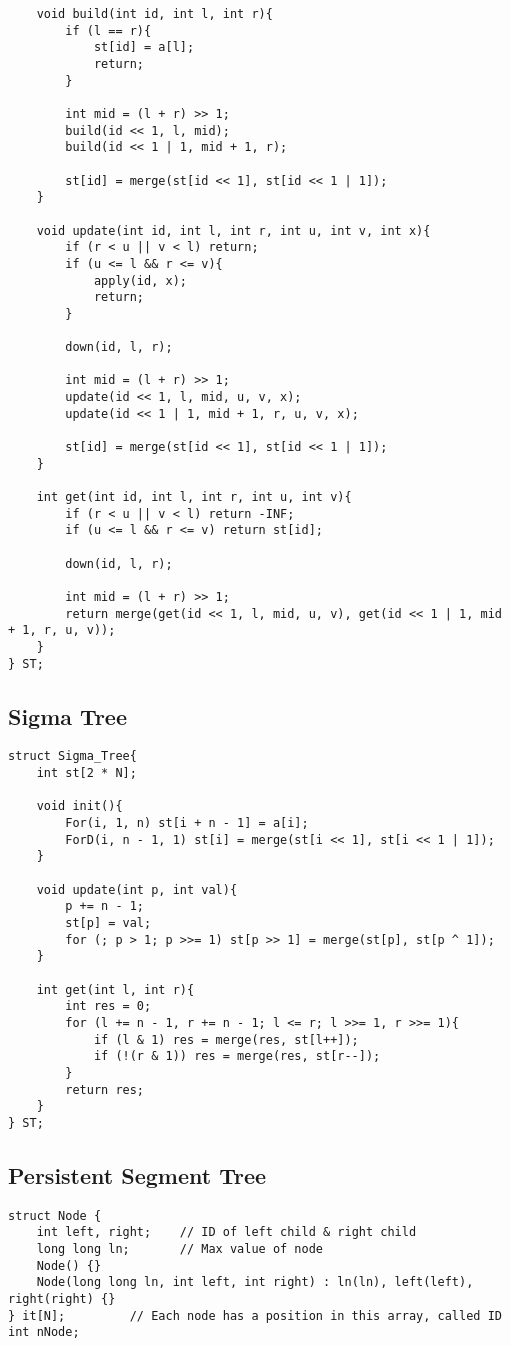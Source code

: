 \documentclass[11pt,a4paper]{article}
\begin{document}
\begin{multicols*}{2}
\begin{lstlisting}
	void build(int id, int l, int r){
		if (l == r){
			st[id] = a[l];
			return;
		}
		
		int mid = (l + r) >> 1;
		build(id << 1, l, mid);
		build(id << 1 | 1, mid + 1, r);
		
		st[id] = merge(st[id << 1], st[id << 1 | 1]);
	}
	
	void update(int id, int l, int r, int u, int v, int x){
		if (r < u || v < l) return;
		if (u <= l && r <= v){
			apply(id, x);
			return;
		}
		
		down(id, l, r);
		
		int mid = (l + r) >> 1;
		update(id << 1, l, mid, u, v, x);
		update(id << 1 | 1, mid + 1, r, u, v, x);
		
		st[id] = merge(st[id << 1], st[id << 1 | 1]);
	}
	
	int get(int id, int l, int r, int u, int v){
		if (r < u || v < l) return -INF;
		if (u <= l && r <= v) return st[id];
		
		down(id, l, r);
		
		int mid = (l + r) >> 1;
		return merge(get(id << 1, l, mid, u, v), get(id << 1 | 1, mid + 1, r, u, v));
	}
} ST;
\end{lstlisting}

\subsection{Sigma Tree}
\begin{lstlisting}
struct Sigma_Tree{
    int st[2 * N];
 
    void init(){
        For(i, 1, n) st[i + n - 1] = a[i];
        ForD(i, n - 1, 1) st[i] = merge(st[i << 1], st[i << 1 | 1]); 
    }
 
 	void update(int p, int val){
 		p += n - 1;
 		st[p] = val;
 		for (; p > 1; p >>= 1) st[p >> 1] = merge(st[p], st[p ^ 1]);
 	}
 	
    int get(int l, int r){
        int res = 0;
        for (l += n - 1, r += n - 1; l <= r; l >>= 1, r >>= 1){
            if (l & 1) res = merge(res, st[l++]);
            if (!(r & 1)) res = merge(res, st[r--]);
        }
        return res;
    }
} ST;
\end{lstlisting}

\subsection{Persistent Segment Tree}
\begin{lstlisting}
struct Node {
    int left, right;    // ID of left child & right child
    long long ln;       // Max value of node
    Node() {}
    Node(long long ln, int left, int right) : ln(ln), left(left), right(right) {}
} it[N];         // Each node has a position in this array, called ID
int nNode;


\end{lstlisting}
\end{multicols*}
\end{document}
